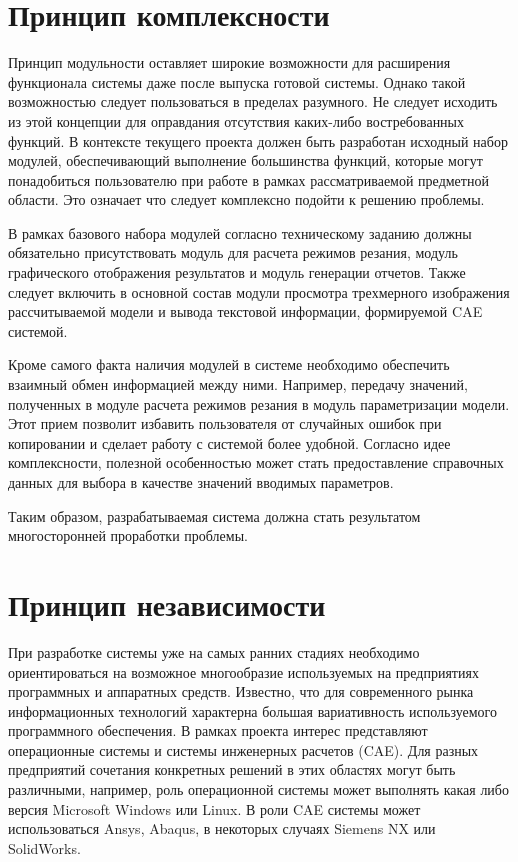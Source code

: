 \documentclass[14pt,oneside,final]{extreport}
\begin{document}
	\section{Принцип комплексности}
	Принцип модульности оставляет широкие возможности для расширения функционала системы даже после выпуска готовой системы. Однако такой возможностью следует пользоваться в пределах разумного. Не следует исходить из этой концепции для оправдания отсутствия каких-либо востребованных функций. В контексте текущего проекта должен быть разработан исходный набор модулей, обеспечивающий выполнение большинства функций, которые могут понадобиться пользователю при работе в рамках рассматриваемой предметной области. Это означает что следует комплексно подойти к решению проблемы. 
	    
	В рамках базового набора модулей согласно техническому заданию должны обязательно присутствовать модуль для расчета режимов резания, модуль графического отображения результатов и модуль генерации отчетов. Также следует включить в основной состав модули просмотра трехмерного изображения рассчитываемой модели и вывода текстовой информации, формируемой CAE системой. 
	    
	Кроме самого факта наличия модулей в системе необходимо обеспечить взаимный обмен информацией между ними. Например, передачу значений, полученных в модуле расчета режимов резания в модуль параметризации модели. Этот прием позволит избавить пользователя от случайных ошибок при копировании и сделает работу с системой более удобной. Согласно идее комплексности, полезной особенностью может стать предоставление справочных данных для выбора в качестве значений вводимых параметров. 
	    
	Таким образом, разрабатываемая система должна стать результатом многосторонней проработки проблемы. 
	    

	\section{Принцип независимости}
	При разработке системы уже на самых ранних стадиях необходимо ориентироваться на возможное многообразие используемых на  предприятиях программных и аппаратных средств. Известно, что для  современного рынка информационных технологий характерна большая вариативность используемого программного обеспечения. В рамках проекта интерес представляют операционные системы и системы инженерных расчетов (CAE). Для разных предприятий сочетания конкретных решений в этих областях могут быть различными, например, роль операционной системы может выполнять какая либо версия Microsoft Windows или  Linux. В роли CAE системы может использоваться Ansys, Abaqus, в некоторых  случаях Siemens NX или SolidWorks. 
	
\end{document}
